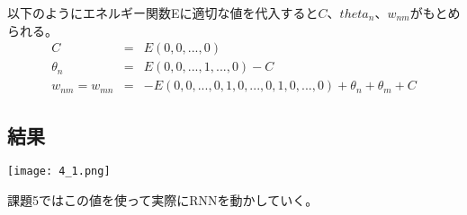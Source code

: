 \documentclass[a4j,11pt,twoside]{jarticle}
\begin{document}
    以下のようにエネルギー関数Eに適切な値を代入すると$C、theta_n、w_{nm}$がもとめられる。
    \begin{eqnarray*}
    C &=& E(0,0,...,0) \\
    \theta_n &=& E(0,0,...,1,...,0) - C \\
    w_{nm} = w_{mn} &=& - E(0,0,...,0,1,0,...,0,1,0,...,0) + \theta_n + \theta_m + C
  \end{eqnarray*}

  \subsection*{結果}
  \begin{center}
    \texttt{[image: 4\_1.png]}
  \end{center}

  課題5ではこの値を使って実際にRNNを動かしていく。
\end{document}
